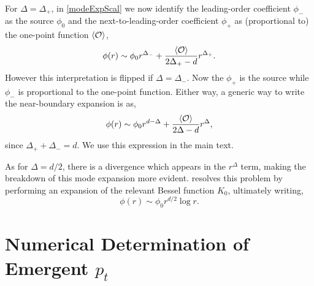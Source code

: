 \documentclass[12pt,a4paper]{article}
\begin{document}
\begin{appendices}
For $\Delta = \Delta_+$, in \eqref{modeExpScal} we now identify the leading-order coefficient $\phi_-$ as the source $\phi_0$ and the next-to-leading-order coefficient $\phi_+$ as (proportional to) the one-point function $\expval{\mathcal{O}}$,
\begin{equation}
\phi(r) \sim \phi_0 r^{\Delta_-} + \frac{\expval{\mathcal{O}}}{2\Delta_+ - d}r^{\Delta_+}.
\end{equation}
However this interpretation is flipped if $\Delta = \Delta_-$. Now the $\phi_+$ is the source while $\phi_-$ is proportional to the one-point function. Either way, a generic way to write the near-boundary expansion is as,
\begin{equation}
\phi(r) \sim \phi_0 r^{d-\Delta} + \frac{\expval{\mathcal{O}}}{2\Delta - d}r^{\Delta},
\end{equation}
since $\Delta_+ + \Delta_- = d$. We use this expression in the main text.

As for $\Delta = d/2$, there is a divergence which appears in the $r^\Delta$ term, making the breakdown of this mode expansion more evident. \cite{Minces:1999eg} resolves this problem by performing an expansion of the relevant Bessel function $K_0$, ultimately writing,
\begin{equation}
\phi(r) \sim \phi_0 r^{d/2}\log r.\label{logPhi}
\end{equation}


\section{Numerical Determination of Emergent $p_t$}\label{appB}


\end{appendices}
\end{document}
